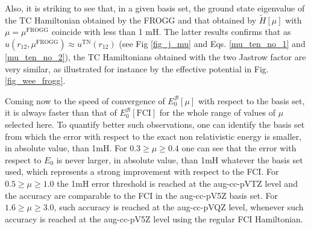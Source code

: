 \documentclass[aip,jcp,reprint,noshowkeys,superscriptaddress]{revtex4-1}
\newcommand{\mfrogg}[0]{\mu^\text{FROGG}}
\newcommand{\basis}[0]{\mathcal{B}}
\begin{document}
Also, it is striking to see that, in a given basis set, the ground state eigenvalue of the TC Hamiltonian obtained by the FROGG and that obtained by $\tilde{H}[\mu]$ with $\mu=\mfrogg$ coincide with less than 1 mH. 
The latter results confirms that as $u(r_{12},\mfrogg) \approx u^{\text{TN}}(r_{12})$ (see Fig \ref{fig_j_mu} and Eqs. \eqref{mu_ten_no_1} and \eqref{mu_ten_no_2}), the TC Hamiltonians obtained with the two Jastrow factor are very similar, as illustrated for instance by the effective potential in Fig. \ref{fig_wee_frogg}. 

Coming now to the speed of convergence of $E_0^{\basis}[\mu]$ with respect to the basis set, it is always faster than that of $E_0^{\basis}[\text{FCI}]$ for the whole range of values of $\mu$ selected here. 
To quantify better such observations, one can identify the basis set from which the error with respect to the exact non relativistic energy is smaller, in absolute value, than 1mH. 
For $0.3\ge\mu\ge0.4$ one can see that the error with respect to $E_0$ is never larger, in absolute value, than 1mH whatever the basis set used, which represents a strong improvement with respect to the FCI. For $0.5\ge \mu \ge 1.0$ the 1mH error threshold is reached at the aug-cc-pVTZ level and the accuracy are comparable to the FCI in the aug-cc-pV5Z basis set. For $1.6\ge \mu \ge 3.0$, such accuracy is reached at the aug-cc-pVQZ level, whenever such accuracy is reached at the aug-cc-pV5Z level using the regular FCI Hamiltonian. 
\end{document}
